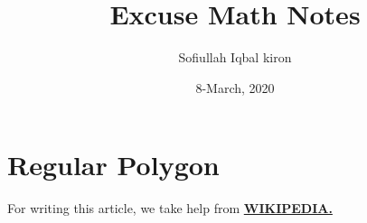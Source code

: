 \documentclass[11 pt]{article}
\title{Excuse Math Notes}
\author{Sofiullah Iqbal kiron}
\affil{Department of CSE, BSMRSTU}
\date{8-March, 2020}
\begin{document}
\maketitle

\section{Regular Polygon}
For writing this article, we take help from \href{https://en.wikipedia.org/wiki/Regular_polygon}{\textbf{WIKIPEDIA.}}
\end{document}
